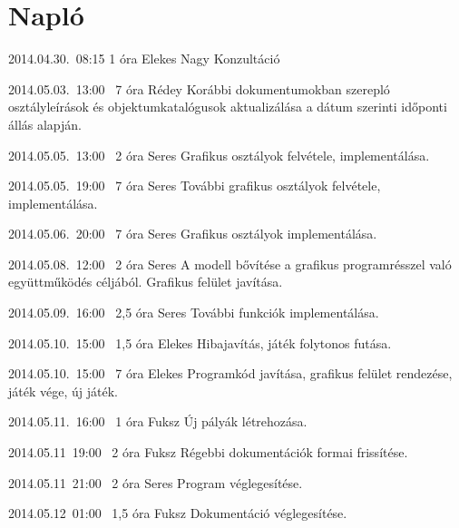 %
\section{Napló}

\begin{naplo}

\bejegyzes
{2014.04.30.~08:15}
{1 óra}
{Elekes\newline
Nagy}
{Konzultáció}

\bejegyzes
{2014.05.03.~13:00~}
{7 óra}
{Rédey}
{Korábbi dokumentumokban szerepló osztályleírások és objektumkatalógusok aktualizálása a dátum szerinti időponti állás alapján.}

\bejegyzes
{2014.05.05.~13:00~}
{2 óra}
{Seres}
{Grafikus osztályok felvétele, implementálása.}

\bejegyzes
{2014.05.05.~19:00~}
{7 óra}
{Seres}
{További grafikus osztályok felvétele, implementálása.}

\bejegyzes
{2014.05.06.~20:00~}
{7 óra}
{Seres}
{Grafikus osztályok implementálása.}

\bejegyzes
{2014.05.08.~12:00~}
{2 óra}
{Seres}
{A modell bővítése a grafikus programrésszel való együttműködés céljából. Grafikus felület javítása.}

\bejegyzes
{2014.05.09.~16:00~}
{2,5 óra}
{Seres}
{További funkciók implementálása.}

\bejegyzes
{2014.05.10.~15:00~}
{1,5 óra}
{Elekes}
{Hibajavítás, játék folytonos futása.}

\bejegyzes
{2014.05.10.~15:00~}
{7 óra}
{Elekes}
{Programkód javítása, grafikus felület rendezése, játék vége, új játék.}

\bejegyzes
{2014.05.11.~16:00~}
{1 óra}
{Fuksz}
{Új pályák létrehozása.}

\bejegyzes
{2014.05.11~19:00~}
{2 óra}
{Fuksz}
{Régebbi dokumentációk formai frissítése.}

\bejegyzes
{2014.05.11~21:00~}
{2 óra}
{Seres}
{Program véglegesítése.}

\bejegyzes
{2014.05.12~01:00~}
{1,5 óra}
{Fuksz}
{Dokumentáció véglegesítése.}



\end{naplo}

